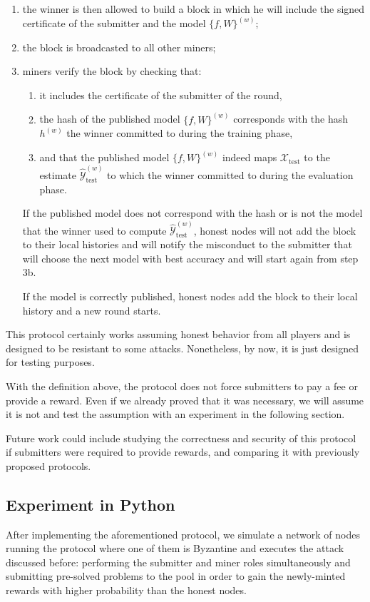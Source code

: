 \documentclass[conference]{IEEEtran}
\begin{document}
\begin{enumerate}
\begin{enumerate}
        \item the winner is then allowed to build a block in which he will include the signed certificate of the submitter and the model $\{f,W\}^{(w)}$;
        \item the block is broadcasted to all other miners;
        \item miners verify the block by checking that:
        \begin{enumerate}
            \item it includes the certificate of the submitter of the round,
            \item the hash of the published model $\{f,W\}^{(w)}$ corresponds with the hash $h^{(w)}$ the winner committed to during the training phase,
            \item and that the published model $\{f,W\}^{(w)}$ indeed maps $\mathcal X_\text{test}$ to the estimate $\hat{\mathcal Y}_{\text{test}}^{(w)}$ to which the winner committed to during the evaluation phase.
        \end{enumerate}
        If the published model does not correspond with the hash or is not the model that the winner used to compute $\hat{\mathcal Y}_{\text{test}}^{(w)}$, honest nodes will not add the block to their local histories and will notify the misconduct to the submitter that will choose the next model with best accuracy and will start again from step 3b.
        
        If the model is correctly published, honest nodes add the block to their local history and a new round starts.
    \end{enumerate}
\end{enumerate}

This protocol certainly works assuming honest behavior from all players and is designed to be resistant to some attacks. Nonetheless, by now, it is just designed for testing purposes.

With the definition above, the protocol does not force submitters to pay a fee or provide a reward. Even if we already proved that it was necessary, we will assume it is not and test the assumption with an experiment in the following section.

Future work could include studying the correctness and security of this protocol if submitters were required to provide rewards, and comparing it with previously proposed protocols.

\subsection{Experiment in Python}
After implementing the aforementioned protocol, we simulate a network of nodes running the protocol where one of them is Byzantine and executes the attack discussed before: performing the submitter and miner roles simultaneously and submitting pre-solved problems to the pool in order to gain the newly-minted rewards with higher probability than the honest nodes.
\end{document}
